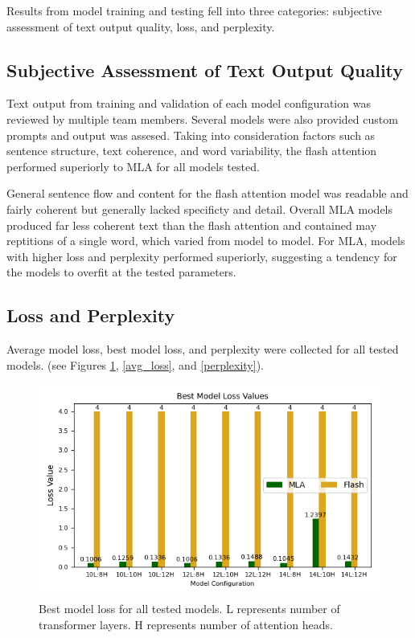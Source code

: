 Results from model training and testing fell into three categories: subjective assessment of text output quality, loss, and perplexity.
\subsection{Subjective Assessment of Text Output Quality}
Text output from training and validation of each model configuration was reviewed by multiple team members. 
Several models were also provided custom prompts and output was assesed.
Taking into consideration factors such as sentence structure, text coherence, and word variability, the flash attention performed superiorly to MLA for all models tested\n.

General sentence flow and content for the flash attention model was readable and fairly coherent but generally lacked specificty and detail.  
Overall MLA models produced far less coherent text than the flash attention and contained may reptitions of a single word, which varied from model to model.
For MLA, models with higher loss and perplexity performed superiorly, suggesting a tendency for the models to overfit at the tested parameters.
\subsection{Loss and Perplexity}
Average model loss, best model loss, and perplexity were collected for all tested models. (see Figures \ref{best_loss}, \ref{avg_loss}, and \ref{perplexity}).

\begin{figure}[H]
    \centering
    \includegraphics[width=\linewidth]{sections/images/best_loss.png}
    \caption{Best model loss for all tested models. L represents number of transformer layers. H represents number of attention heads.}
    \label{best_loss}
\end{figure}

